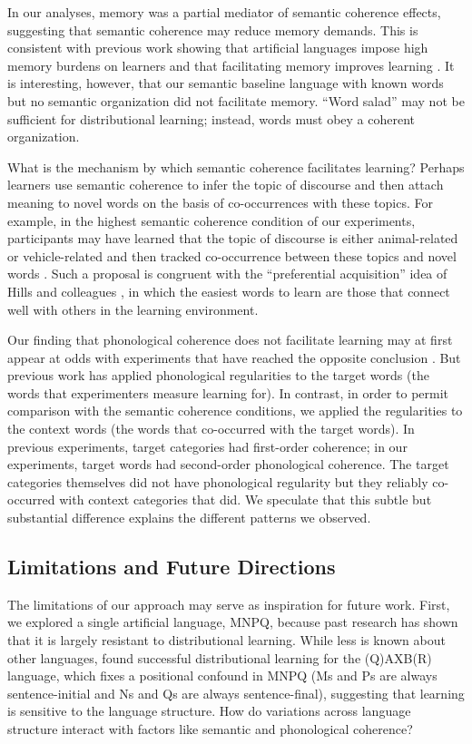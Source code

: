 \documentclass[man,floatsintext]{apa6}
\begin{document}
In our analyses, memory was a partial mediator of semantic coherence effects, suggesting that semantic coherence may reduce memory demands. This is consistent with previous work showing that artificial languages impose high memory burdens on learners and that facilitating memory improves learning \citep{frank2011}. It is interesting, however, that our semantic baseline language with known words but no semantic organization did not facilitate memory. ``Word salad'' may not be sufficient for distributional learning; instead, words must obey a coherent organization.

What is the mechanism by which semantic coherence facilitates learning? Perhaps learners use semantic coherence to infer the topic of discourse and then attach meaning to novel words on the basis of co-occurrences with these topics. For example, in the highest semantic coherence condition of our experiments, participants may have learned that the topic of discourse is either animal-related or vehicle-related and then tracked co-occurrence between these topics and novel words \citep{frank2013}. Such a proposal is congruent with the ``preferential acquisition'' idea of Hills and colleagues \citeyearpar{hills2009, hills2010}, in which the easiest words to learn are those that connect well with others in the learning environment. 

Our finding that phonological coherence does not facilitate learning may at first appear at odds with experiments that have reached the opposite conclusion \citep{frigo1998, lany2010, monaghan2005}. But previous work has applied phonological regularities to the target words (the words that experimenters measure learning for).  In contrast, in order to permit comparison with the semantic coherence conditions, we applied the regularities to the context words (the words that co-occurred with the target words). In previous experiments, target categories had first-order coherence; in our experiments, target words had second-order phonological coherence. The target categories themselves did not have phonological regularity but they reliably co-occurred with context categories that did. We speculate that this subtle but substantial difference explains the different patterns we observed.

\subsection{Limitations and Future Directions}

The limitations of our approach may serve as inspiration for future work. First, we explored a single artificial language, MNPQ, because past research has shown that it is largely resistant to distributional learning. While less is known about other languages, \cite{reeder2009} found successful distributional learning for the (Q)AXB(R) language, which fixes a positional confound in MNPQ (Ms and Ps are always sentence-initial and Ns and Qs are always sentence-final), suggesting that learning is sensitive to the language structure. How do variations across language structure interact with factors like semantic and phonological coherence? 
\end{document}
